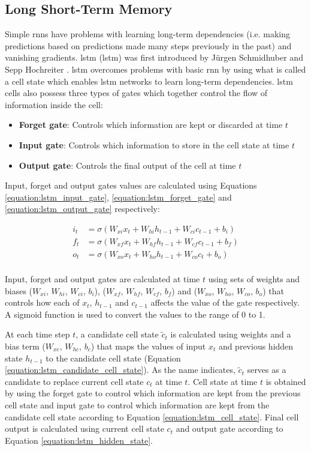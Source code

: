 \subsection{Long Short-Term Memory}
\label{section:lstm}
Simple \acrshort{rnn}s have problems with learning long-term dependencies (i.e. making predictions based on predictions made many steps previously in the past) and vanishing gradients. \acrlong{lstm} (\acrshort{lstm}) was first introduced by Jürgen Schmidhuber and Sepp Hochreiter \cite{Hochreiter1997}. \acrshort{lstm} overcomes problems with basic \acrshort{rnn} by using what is called a cell state which enables \acrshort{lstm} networks to learn long-term dependencies. \acrshort{lstm} cells also possess three types of gates which together control the flow of information inside the cell:
\begin{itemize}
    \item \textbf{Forget gate}: Controls which information are kept or discarded at time $t$
    \item \textbf{Input gate}: Controls which information to store in the cell state at time $t$
    \item \textbf{Output gate}: Controls the final output of the cell at time $t$
\end{itemize}

Input, forget and output gates values are calculated using Equations \ref{equation:lstm_input_gate}, \ref{equation:lstm_forget_gate} and \ref{equation:lstm_output_gate} respectively:

\begin{align}
i_t &= \sigma(W_{xi}x_t + W_{hi}h_{t-1}+W_{ci}c_{t-1}+b_i) \label{equation:lstm_input_gate}\\
f_t &= \sigma(W_{xf}x_t + W_{hf}h_{t-1}+W_{cf}c_{t-1}+b_f) \label{equation:lstm_forget_gate}\\
o_t &= \sigma(W_{xo}x_t + W_{ho}h_{t-1}+W_{co}c_t+b_o) \label{equation:lstm_output_gate}\\
\end{align}

Input, forget and output gates are calculated at time $t$ using sets of weights and biases ($W_{xi}$, $W_{hi}$, $W_{ci}$, $b_i$), ($W_{xf}$, $W_{hf}$, $W_{cf}$, $b_f$) and ($W_{xo}$, $W_{ho}$, $W_{co}$, $b_o$) that controls how each of $x_t$, $h_{t-1}$ and $c_{t-1}$ affects the value of the gate respectively. A sigmoid function is used to convert the values to the range of 0 to 1. 

At each time step $t$, a candidate cell state $\tilde{c}_t$ is calculated using weights and a bias term ($W_{xc}$, $W_{hc}$, $b_c$) that maps the values of input $x_t$ and previous hidden state $h_{t-1}$ to the candidate cell state (Equation \ref{equation:lstm_candidate_cell_state}). As the name indicates, $\tilde{c}_t$ serves as a candidate to replace current cell state $c_t$ at time $t$. Cell state at time $t$ is obtained by using the forget gate to control which information are kept from the previous cell state and input gate to control which information are kept from the candidate cell state according to Equation \ref{equation:lstm_cell_state}. Final cell output is calculated using current cell state $c_t$ and output gate according to Equation \ref{equation:lstm_hidden_state}.

